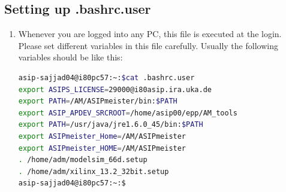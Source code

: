\subsection{Setting up .bashrc.user}
\begin{enumerate}[resume]
\item Whenever you are logged into any PC, this file is executed at the login. Please set different variables in this file carefully. Usually the following variables should be like this:
\begin{lstlisting}[language=bash]
asip-sajjad04@i80pc57:~:$cat .bashrc.user
export ASIPS_LICENSE=29000@i80asip.ira.uka.de
export PATH=/AM/ASIPmeister/bin:$PATH
export ASIP_APDEV_SRCROOT=/home/asip00/epp/AM_tools
export PATH=/usr/java/jre1.6.0_45/bin:$PATH
export ASIPmeister_Home=/AM/ASIPmeister
export ASIPmeister_HOME=/AM/ASIPmeister
. /home/adm/modelsim_66d.setup
. /home/adm/xilinx_13.2_32bit.setup
asip-sajjad04@i80pc57:~:$
\end{lstlisting}
\end{enumerate}